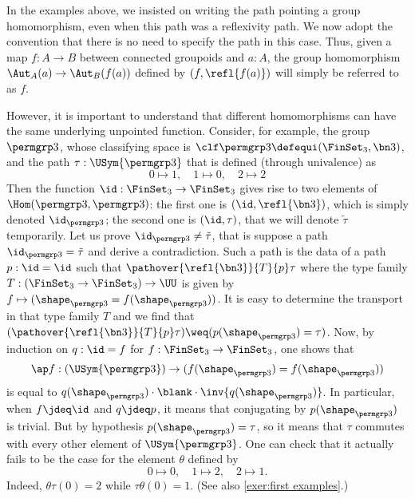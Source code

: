 \begin{remark}
  In the examples above, we insisted on writing the path pointing a group
  homomorphism, even when this path was a reflexivity path. We now adopt
  the convention that there is no need to specify the path in this case. Thus, given a
  map $f:A \to B$ between connected groupoids and $a:A$, the group
  homomorphism $\Aut_A(a) \to \Aut_B(f(a))$ defined by
  $(f,\refl{f(a)})$ will simply be referred to as $f$.

  However, it is important to understand that different homomorphisms
  can have the same underlying unpointed function. Consider, for
  example, the group $\permgrp 3$, whose classifying space is
  $\clf \permgrp 3\defequi (\FinSet_3,\bn 3)$, and the path
  $\tau:\USym{\permgrp 3}$ that is defined (through
  univalence) as
  \begin{displaymath}
    0\mapsto 1,\quad 1\mapsto 0,\quad 2 \mapsto 2
  \end{displaymath}
  Then the function $\id: \FinSet_3 \to \FinSet_3$ gives rise to two
  elements of $\Hom(\permgrp 3,\permgrp 3)$: the first one is
  $(\id,\refl{\bn 3})$, which is simply denoted $\id_{\permgrp 3}$;
  the second one is $(\id,\tau)$, that we will denote $\tilde\tau$
  temporarily. Let us prove $\id_{\permgrp 3} \neq \tilde \tau$, that
  is suppose a path $\id_{\permgrp 3}= \tilde \tau$ and derive a
  contradiction. Such a path is the data of a path $p:\id = \id$ such
  that $\pathover {\refl{\bn 3}} {T} {p} \tau$ where the type family
  $T:(\FinSet_3\to\FinSet_3) \to \UU$ is given by
  $f\mapsto (\shape_{\permgrp 3} = f(\shape_{\permgrp 3}))$. It is easy to
  determine the transport in that type family $T$ and we find that
  $(\pathover {\refl{\bn 3}} {T} {p} \tau) \weq (p(\shape_{\permgrp
    3})=\tau)$. Now, by induction on $q:\id=f$ for
  $f:\FinSet_3 \to \FinSet_3$, one shows that
  \begin{displaymath}
    \ap f : (\USym{\permgrp 3}) \to
    (f(\shape_{\permgrp 3}) = f(\shape_{\permgrp 3}))
  \end{displaymath}
  is equal to
  $q(\shape_{\permgrp 3})\cdot {\blank}\cdot \inv{q(\shape_{\permgrp
      3})}$. In particular, when $f\jdeq \id$ and $q\jdeq p$, it means
  that conjugating by $p(\shape_{\permgrp 3})$ is trivial. But by
  hypothesis $p(\shape_{\permgrp 3}) = \tau$, so it means that $\tau$
  commutes with every other element of
  $\USym{\permgrp 3}$. One can check that it
  actually fails to be the case for the element $\theta$ defined by
  \begin{displaymath}
    0\mapsto 0,\quad 1\mapsto 2,\quad 2\mapsto 1 .
  \end{displaymath}
  Indeed, $\theta\tau(0) = 2$ while $\tau\theta(0) = 1$. (See also
  \cref{exer:first examples}.)
\end{remark}

